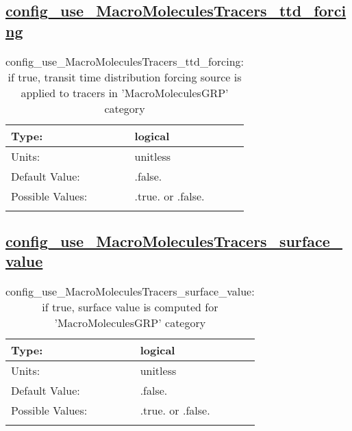 \subsection[config\_use\_MacroMoleculesTracers\_ttd\_forcing]{\hyperref[sec:nm_tab_tracer_forcing_MacroMoleculesTracers]{config\_use\_MacroMoleculesTracers\_ttd\_forcing}}
\label{subsec:nm_sec_config_use_MacroMoleculesTracers_ttd_forcing}
\begin{center}
\begin{longtable}{| p{2.0in} || p{4.0in} |}
    \hline
    Type: & logical \\
    \hline
    Units: & \si{unitless} \\
    \hline
    Default Value: & .false. \\
    \hline
    Possible Values: & .true. or .false. \\
    \hline
    \caption{config\_use\_MacroMoleculesTracers\_ttd\_forcing: if true, transit time distribution forcing source is applied to tracers in 'MacroMoleculesGRP' category}
\end{longtable}
\end{center}
\subsection[config\_use\_MacroMoleculesTracers\_surface\_value]{\hyperref[sec:nm_tab_tracer_forcing_MacroMoleculesTracers]{config\_use\_MacroMoleculesTracers\_surface\_value}}
\label{subsec:nm_sec_config_use_MacroMoleculesTracers_surface_value}
\begin{center}
\begin{longtable}{| p{2.0in} || p{4.0in} |}
    \hline
    Type: & logical \\
    \hline
    Units: & \si{unitless} \\
    \hline
    Default Value: & .false. \\
    \hline
    Possible Values: & .true. or .false. \\
    \hline
    \caption{config\_use\_MacroMoleculesTracers\_surface\_value: if true, surface value is computed for 'MacroMoleculesGRP' category}
\end{longtable}
\end{center}
